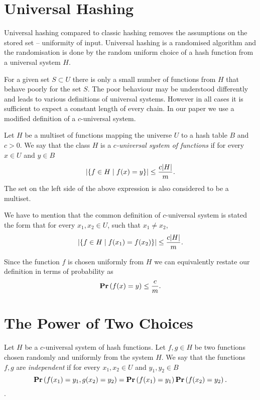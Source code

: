 \section{Universal Hashing}
Universal hashing compared to classic hashing removes the assumptions on the stored set -- uniformity of input. Universal hashing is a randomised algorithm and the randomisation is done by the random uniform choice of a hash function from a universal system $H$. 

For a given set $S \subset U$ there is only a small number of functions from $H$ that behave poorly for the set $S$. The poor behaviour may be understood differently and leads to various definitions of universal systems. However in all cases it is sufficient to expect a constant length of every chain. In our paper we use a modified definition of a $c$-universal system.

\begin{definition}
\label{definition-c-universal-system}
Let $H$ be a multiset of functions mapping the universe $U$ to a hash table $B$ and $c > 0$. We say that the class $H$ is a \emph{$c$-universal system of functions} if for every $x \in U$ and $y \in B$ 
\[
\left|\lbrace f \in H \mid f(x) = y \rbrace\right| \leq \frac{c |H|}{m} \textit{.}
\]
The set on the left side of the above expression is also considered to be a multiset.
\end{definition}

We have to mention that the common definition of $c$-universal system is stated the form that for every $x_1, x_2 \in U$, such that $x_1 \neq x_2$,
\[
\left|\lbrace f \in H \mid f(x_1) = f(x_2) \rbrace\right| \leq \frac{c |H|}{m} \textit{.}
\]

Since the function $f$ is chosen uniformly from $H$ we can equivalently restate our definition in terms of probability as
\[
\mathbf{Pr}\left(f(x) = y\right) \leq \frac{c}{m}.
\]

\section{The Power of Two Choices}
\begin{definition}
\label{definition-independent-hash-functions}
Let $H$ be a $c$-universal system of hash functions. Let $f, g \in H$ be two functions chosen randomly and uniformly from the system $H$. We say that the functions $f, g$ are \emph{independent} if for every $x_1, x_2 \in U$ and $y_1, y_2 \in B$ $$\mathbf{Pr}\left(f(x_1) = y_1, g(x_2\right) = y_2) = \mathbf{Pr}\left(f(x_1) = y_1\right) \mathbf{Pr}\left(f(x_2) = y_2\right) \textit{.}$$.
\end{definition}


